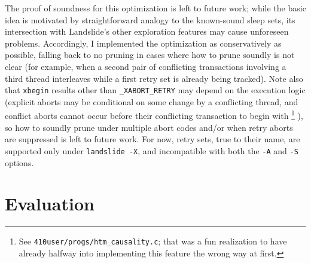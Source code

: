 

The proof of soundness for this optimization is left to future work;
while the basic idea is motivated by straightforward analogy to the known-sound sleep sets,
its intersection with Landslide's other exploration features may cause unforeseen problems.
Accordingly, I implemented the optimization as conservatively as possible,
falling back to no pruning in cases where how to prune soundly is not clear
(for example, when a second pair of conflicting transactions involving a third thread
interleaves while a first retry set is already being tracked).
Note also that {\tt xbegin} results other than {\tt \_XABORT\_RETRY}
may depend on the execution logic
(explicit aborts may be conditional on some change by a conflicting thread,
and conflict aborts cannot occur before their conflicting transaction to begin with%
\footnote{See {\tt 410user/progs/htm\_causality.c}; that was a fun realization to have
already halfway into implementing this feature the wrong way at first.}%
),
so how to soundly prune under multiple abort codes
and/or when retry aborts are suppressed is left to future work.
For now, retry sets, true to their name,
are supported only under {\tt landslide -X},
and incompatible with both the {\tt -A} and {\tt -S} options.


\section{Evaluation}

